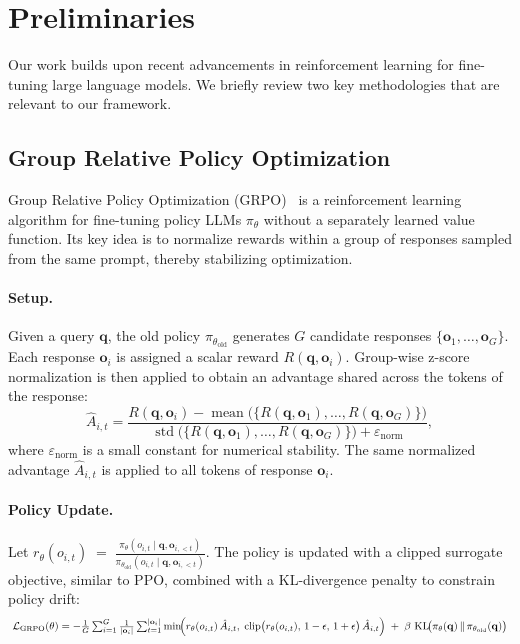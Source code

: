 \section{Preliminaries}
\label{sec:preli}

Our work builds upon recent advancements in reinforcement learning for fine-tuning large language models. We briefly review two key methodologies that are relevant to our framework.

\subsection{Group Relative Policy Optimization}

Group Relative Policy Optimization (GRPO)~\citep{Shao2024DeepSeekMathPT} is a reinforcement learning algorithm for fine-tuning policy LLMs $\pi_\theta$ without a separately learned value function. Its key idea is to normalize rewards within a group of responses sampled from the same prompt, thereby stabilizing optimization.

\paragraph{Setup.}  
Given a query $\mathbf{q}$, the old policy $\pi_{\theta_{\text{old}}}$ generates $G$ candidate responses $\{\mathbf{o}_1,\dots,\mathbf{o}_G\}$. Each response $\mathbf{o}_i$ is assigned a scalar reward $R(\mathbf{q},\mathbf{o}_i)$. Group-wise z-score normalization is then applied to obtain an advantage shared across the tokens of the response:
$$
\hat{A}_{i,t}
=
\frac{R(\mathbf{q},\mathbf{o}_i) - \operatorname{mean}\!\bigl(\{R(\mathbf{q},\mathbf{o}_1),\dots,R(\mathbf{q},\mathbf{o}_G)\}\bigr)}
{\operatorname{std}\!\bigl(\{R(\mathbf{q},\mathbf{o}_1),\dots,R(\mathbf{q},\mathbf{o}_G)\}\bigr) + \varepsilon_{\text{norm}}},
$$
where $\varepsilon_{\text{norm}}$ is a small constant for numerical stability. The same normalized advantage $\hat{A}_{i,t}$ is applied to all tokens of response $\mathbf{o}_i$.

\paragraph{Policy Update.}  
Let
$
r_{\theta}(o_{i,t}) \;=\; \frac{\pi_{\theta}(o_{i,t}\mid \mathbf{q},\mathbf{o}_{i,<t})}
{\pi_{\theta_{\text{old}}}(o_{i,t}\mid \mathbf{q},\mathbf{o}_{i,<t})}.
$
The policy is updated with a clipped surrogate objective, similar to PPO, combined with a KL-divergence penalty to constrain policy drift:
\[\scalebox{0.85}{
$
\mathcal{L}_{\text{GRPO}}(\theta)
= -\frac{1}{G}\sum_{i=1}^G \frac{1}{|\mathbf{o}_i|}
\sum_{t=1}^{|\mathbf{o}_i|}
\min\!\Bigl(
r_{\theta}(o_{i,t})\,\hat{A}_{i,t},\;
\operatorname{clip}\bigl(r_{\theta}(o_{i,t}),\,1-\epsilon,\,1+\epsilon\bigr)\,\hat{A}_{i,t}
\Bigr)
\;+\;
\beta\,
\operatorname{KL}\!\bigl(\pi_{\theta}(\mathbf{q}) \,\|\, \pi_{\theta_{\text{old}}}(\mathbf{q})\bigr)$
}\]

